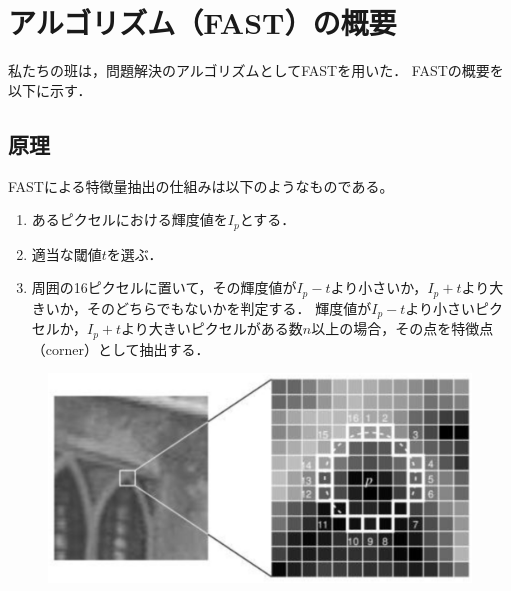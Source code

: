 \section{アルゴリズム（FAST）の概要}
私たちの班は，問題解決のアルゴリズムとしてFASTを用いた．
FASTの概要を以下に示す．

\subsection{原理}
FASTによる特徴量抽出の仕組みは以下のようなものである。
\begin{enumerate}
    \item あるピクセルにおける輝度値を$I_p$とする．
    \item 適当な閾値$t$を選ぶ．
    \item 周囲の16ピクセルに置いて，その輝度値が$I_p-t$より小さいか，$I_p+t$より大きいか，そのどちらでもないかを判定する．
    輝度値が$I_p-t$より小さいピクセルか，$I_p+t$より大きいピクセルがある数$n$以上の場合，その点を特徴点（corner）として抽出する．
\end{enumerate}
\begin{figure}[H]
    \begin{center}
        \includegraphics[width=120mm]{./figures/overview/fig1.eps}
    \end{center}
\end{figure}

